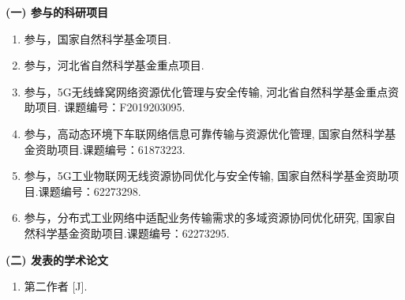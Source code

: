 \makeatletter
{}
  \pagestyle{fancy}%
  \fancyhf{}
\makeatother

\begin{achievement}

{\noindent\textbf{(一) 参与的科研项目}}    %
\begin{enumerate}\setlength{\itemsep}{-0.4em}%
\renewcommand{\labelenumi}{[\theenumi]}
\item 参与，国家自然科学基金项目.
\item 参与，河北省自然科学基金重点项目.
\item 参与，5G无线蜂窝网络资源优化管理与安全传输, 河北省自然科学基金重点资助项目. 课题编号：F2019203095.
\item 参与，高动态环境下车联网络信息可靠传输与资源优化管理, 国家自然科学基金资助项目.课题编号：61873223.
\item 参与，5G工业物联网无线资源协同优化与安全传输, 国家自然科学基金资助项目.课题编号：62273298.
\item 参与，分布式工业网络中适配业务传输需求的多域资源协同优化研究, 国家自然科学基金资助项目.课题编号：62273295.
\end{enumerate}


{\noindent\textbf{(二) 发表的学术论文}}    %
\begin{enumerate}\setlength{\itemsep}{-0.4em}%
\renewcommand{\labelenumi}{[\theenumi]}
\item 第二作者  [J].%
\end{enumerate}



\end{achievement}
